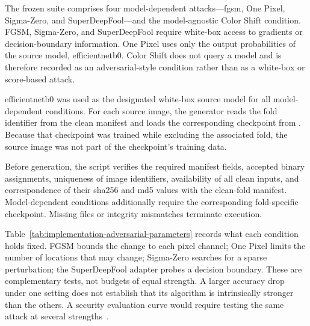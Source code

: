 The frozen suite comprises four model-dependent attacks---\gls{fgsm}, One
Pixel, Sigma-Zero, and SuperDeepFool---and the model-agnostic Color Shift
condition. FGSM, Sigma-Zero, and SuperDeepFool require white-box access to
gradients or decision-boundary information. One Pixel uses only the output
probabilities of the source model, \gls{efficientnetb0}. Color Shift does not
query a model and is therefore recorded as an adversarial-style condition
rather than as a white-box or score-based attack.

\gls{efficientnetb0} was used as the designated white-box source model for all
model-dependent conditions. For each source image, the generator reads the fold identifier from
the clean manifest and loads the corresponding checkpoint from
. Because that checkpoint
was trained while excluding the associated fold, the source image was not part
of the checkpoint's training data.

Before generation, the script verifies the required manifest fields, accepted
binary assignments, uniqueness of image identifiers, availability of all clean
inputs, and correspondence of their \gls{sha256} and \gls{md5} values with the
clean-fold manifest. Model-dependent conditions additionally require the
corresponding fold-specific checkpoint. Missing files or integrity mismatches
terminate execution.

Table~\ref{tab:implementation-adversarial-parameters} records what each
condition holds fixed. FGSM bounds the change to each pixel channel; One
Pixel limits the number of locations that may change; Sigma-Zero searches
for a sparse perturbation; the SuperDeepFool adapter probes a decision
boundary. These are complementary tests, not budgets of equal strength.
A larger accuracy drop under one setting does not establish that its
algorithm is intrinsically stronger than the others. A security evaluation
curve would require testing the same attack at several
strengths~\cite[Sec.~3.5]{biggio2018wild}.

